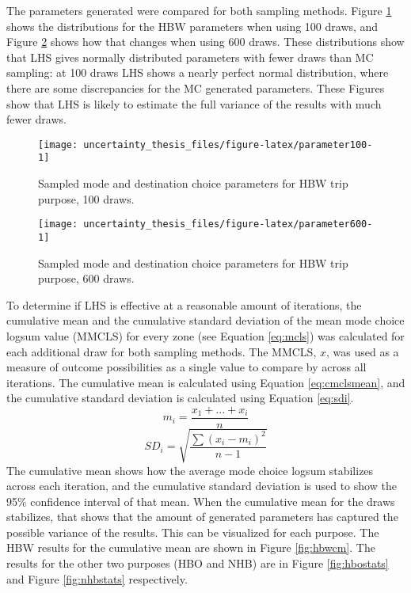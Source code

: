 \documentclass[fancy, masters,twoside]{byuthesis}
\begin{document}
The parameters generated were compared for both sampling methods. Figure \ref{fig:parameter100} shows the distributions for the HBW parameters when using 100 draws, and Figure \ref{fig:parameter600} shows how that changes when using 600 draws. These distributions show that LHS gives normally distributed parameters with fewer draws than MC sampling: at 100 draws LHS shows a nearly perfect normal distribution, where there are some discrepancies for the MC generated parameters. These Figures show that LHS is likely to estimate the full variance of the results with much fewer draws.

\begin{figure}

{\centering \texttt{[image: uncertainty\_thesis\_files/figure-latex/parameter100-1]} 

}

\caption{Sampled mode and destination choice parameters for HBW trip purpose, 100 draws.}\label{fig:parameter100}
\end{figure}

\begin{figure}

{\centering \texttt{[image: uncertainty\_thesis\_files/figure-latex/parameter600-1]} 

}

\caption{Sampled mode and destination choice parameters for HBW trip purpose, 600 draws.}\label{fig:parameter600}
\end{figure}

To determine if LHS is effective at a reasonable amount of iterations, the cumulative mean and the cumulative standard deviation of the mean mode choice logsum value (MMCLS) for every zone (see Equation \eqref{eq:mcls}) was calculated for each additional draw for both sampling methods. The MMCLS, \(x\), was used as a measure of outcome possibilities as a single value to compare by across all iterations. The cumulative mean is calculated using Equation \eqref{eq:cmclsmean}, and the cumulative standard deviation is calculated using Equation \eqref{eq:sdi}.
\begin{equation}
m_i = \frac{x_1 + ... + x_i}{n}
\label{eq:cmclsmean}
\end{equation}
\begin{equation}
SD_i = \sqrt{\frac{\sum (x_i - m_i)^2 }{n-1}}
\label{eq:sdi}
\end{equation}
The cumulative mean shows how the average mode choice logsum stabilizes across each iteration, and the cumulative standard deviation is used to show the 95\% confidence interval of that mean. When the cumulative mean for the draws stabilizes, that shows that the amount of generated parameters has captured the possible variance of the results. This can be visualized for each purpose. The HBW results for the cumulative mean are shown in Figure \ref{fig:hbwcm}. The results for the other two purposes (HBO and NHB) are in Figure \ref{fig:hbostats} and Figure \ref{fig:nhbstats} respectively.
\end{document}
